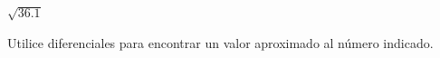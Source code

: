 \setcounter{enumi}{22}
\item $\sqrt{36.1}$
\par
Utilice diferenciales para encontrar un valor aproximado al número indicado.
